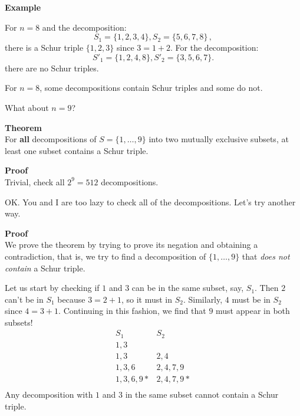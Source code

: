 \documentclass[11pt,a4paper]{article}
\begin{document}
\textbf{Example}

For $n=8$ and the decomposition:
\[
S_1 = \{1,2,3,4\}, S_2 = \{5,6,7,8\}\,,
\]
there is a Schur triple $\{1,2,3\}$ since $3=1+2$. For the decomposition:
\[
S'_1 = \{1,2,4,8\}, S'_2 = \{3,5,6,7\}.
\]
there are no Schur triples.

For $n=8$, some decompositions contain Schur triples and some do not.

What about $n=9$?

\textbf{Theorem}\\
For \textbf{all} decompositions of $S=\{1,\ldots,9\}$ into two mutually exclusive subsets, at least one subset contains a Schur triple.

\textbf{Proof}\\
Trivial, check all $2^9=512$ decompositions.

OK. You and I are too lazy to check all of the decompositions. Let's try another way.

\textbf{Proof}\\
We prove the theorem by trying to prove its negation and obtaining a contradiction, that is, we try to find a decomposition of $\{1,\ldots,9\}$ that \emph{does not contain} a Schur triple.

Let us start by checking if $1$ and $3$ can be in the same subset, say, $S_1$. Then $2$ can't be in $S_1$ because $3=2+1$, so it must in $S_2$. Similarly, $4$ must be in $S_2$ since $4=3+1$. Continuing in this fashion, we find that $9$ must appear in both subsets!
\begin{displaymath}
\begin{array}{ll}
S_1 & S_2\\
1,3 & \\
1,3 & 2,4\\
1,3,6 & 2,4,7,9\\
1,3,6,9* & 2,4,7,9*\\
\end{array}
\end{displaymath}
Any decomposition with $1$ and $3$ in the same subset cannot contain a Schur triple.
\end{document}

